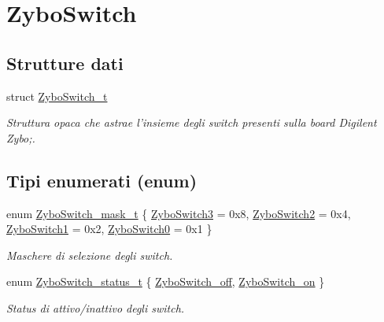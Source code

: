 \hypertarget{group___zybo_switch}{\section{Zybo\+Switch}
\label{group___zybo_switch}
}
\subsection*{Strutture dati}
\begin{DoxyCompactItemize}
\item 
struct \hyperlink{struct_zybo_switch__t}{Zybo\+Switch\+\_\+t}
\begin{DoxyCompactList}\small\item\em Struttura opaca che astrae l'insieme degli switch presenti sulla board Digilent Zybo;. \end{DoxyCompactList}\end{DoxyCompactItemize}
\subsection*{Tipi enumerati (enum)}
\begin{DoxyCompactItemize}
\item 
enum \hyperlink{group___zybo_switch_ga2e0602a824354f25c395f938caba3703}{Zybo\+Switch\+\_\+mask\+\_\+t} \{ \hyperlink{group___zybo_switch_gga2e0602a824354f25c395f938caba3703a73ccea5ad8c919fe962e9a67a3733ee3}{Zybo\+Switch3} = 0x8, 
\hyperlink{group___zybo_switch_gga2e0602a824354f25c395f938caba3703aac2f5ebb28eb3bd93fcdf8019b6a3e9e}{Zybo\+Switch2} = 0x4, 
\hyperlink{group___zybo_switch_gga2e0602a824354f25c395f938caba3703a694a25c87b1ec597d2a6032bf5d34b0f}{Zybo\+Switch1} = 0x2, 
\hyperlink{group___zybo_switch_gga2e0602a824354f25c395f938caba3703a84350e8b6e7a7e2cabf22fc7a1a5c651}{Zybo\+Switch0} = 0x1
 \}
\begin{DoxyCompactList}\small\item\em Maschere di selezione degli switch. \end{DoxyCompactList}\item 
enum \hyperlink{group___zybo_switch_ga4ba6b49b2f47ebb464aefcea7e23e04a}{Zybo\+Switch\+\_\+status\+\_\+t} \{ \hyperlink{group___zybo_switch_gga4ba6b49b2f47ebb464aefcea7e23e04aa1d686faf83e8606e68eec0b7e525a755}{Zybo\+Switch\+\_\+off}, 
\hyperlink{group___zybo_switch_gga4ba6b49b2f47ebb464aefcea7e23e04aafba009508b8822de867af69034e3e4f8}{Zybo\+Switch\+\_\+on}
 \}
\begin{DoxyCompactList}\small\item\em Status di attivo/inattivo degli switch. \end{DoxyCompactList}\end{DoxyCompactItemize}
